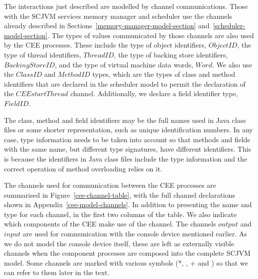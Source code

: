 The interactions just described are modelled by channel
communications.
Those with the SCJVM services memory manager and scheduler use the
channels already described in
Sections~\ref{memory-manager-model-section}
and~\ref{scheduler-model-section}.
The types of values communicated by those channels are also used by
the CEE processes.
These include the type of object identifiers, $ObjectID$, the type of
thread identifiers, $ThreadID$, the type of backing store identifiers,
$BackingStoreID$, and the type of virtual machine data words, $Word$.
We also use the $ClassID$ and $MethodID$ types, which are the types of
class and method identifiers that are declared in the scheduler model
to permit the declaration of the $CEEstartThread$ channel.
Additionally, we declare a field identifier type, $FieldID$.
\begin{zed}
  [FieldID]
\end{zed}
The class, method and field identifiers may be the full names used in
Java class files or some shorter representation, such as unique
identification numbers.
In any case, type information needs to be taken into account so that
methods and fields with the same name, but different type signatures,
have different identifiers.
This is because the identifiers in Java class files include the type
information and the correct operation of method overloading relies on
it.

The channels used for communication between the CEE processes are
summarised in Figure~\ref{cee-channel-table}, with the full channel
declarations shown in Appendix~\ref{cee-model-channels}.
In addition to presenting the name and type for each channel, in the
first two columns of the table.
We also indicate which components of the CEE make use of the channel.
The channels $output$ and $input$ are used for communication with the
console device mentioned earlier.
As we do not model the console device itself, these are left as
externally visible channels when the component processes are composed
into the complete SCJVM model.
Some channels are marked with various symbols (*, \dag{}, {}+{} and
\ddag{}) so that we can refer to them later in the text.

